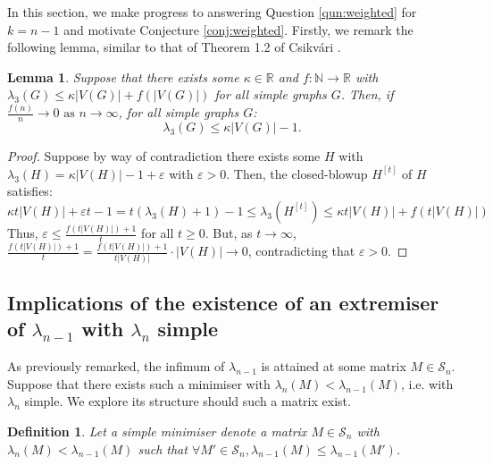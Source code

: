 \documentclass[12pt]{article}
\newtheorem{dfn}[thm]{Definition}
\newtheorem{lmm}[thm]{Lemma}
\begin{document}
In this section, we make progress to answering Question \ref{qun:weighted} for $k=n-1$ and motivate Conjecture \ref{conj:weighted}. Firstly, we remark the following lemma, similar to that of Theorem 1.2 of Csikvári \cite{CsikvariConjecture}.
\begin{lmm} \label{o(n)_off_okay}
Suppose that there exists some $\kappa\in \mathbb{R}$ and $f:\mathbb{N}\to \mathbb{R}$ with $\lambda_{3}(G) \le \kappa |V(G)|+ f(|V(G)|)$ for all simple graphs $G$. Then, if  $\frac{f(n)}{n}\to 0 \text{ as } n\to \infty$, for all simple graphs $G$:
\begin{equation*}
    \lambda_{3}(G) \le \kappa |V(G)| - 1.
\end{equation*}
\end{lmm}
\begin{proof} Suppose by way of contradiction there exists some $H$ with $\lambda_3(H) = \kappa|V(H)| - 1 + \varepsilon$ with $\varepsilon>0$. Then, the closed-blowup $H^{[t]}$ of $H$ satisfies:
\begin{equation*}
   \kappa t|V(H)| + \varepsilon t - 1 = t(\lambda_3(H)+1) - 1 \le \lambda_3(H^{[t]}) \le \kappa t|V(H)| + f(t|V(H)|)
\end{equation*}
Thus, $\varepsilon \le \frac{f(t|V(H)|) + 1}{t}$ for all $t\ge 0$. But, as $t\to \infty$, $\frac{f(t|V(H)|) + 1}{t} = \frac{f(t|V(H)|) + 1}{t|V(H)|}\cdot |V(H)|\to 0$, contradicting that $\varepsilon>0$. 
\end{proof}

\subsection{Implications of the existence of an extremiser of $\lambda_{n-1}$ with $\lambda_{n}$ simple}

As previously remarked, the infimum of $\lambda_{n-1}$ is attained at some matrix $M\in \mathcal{S}_n$. Suppose that there exists such a minimiser with $\lambda_{n}(M)<\lambda_{n-1}(M)$, i.e. with $\lambda_{n}$ simple. We explore its structure should such a matrix exist.

\begin{dfn}
    Let a simple minimiser denote a matrix $M \in \mathcal{S}_n$ with $\lambda_n(M) < \lambda_{n-1}(M)$ such that $\forall M'\in \mathcal{S}_n, \lambda_{n-1}(M)\le \lambda_{n-1}(M')$. 
\end{dfn}
\end{document}
